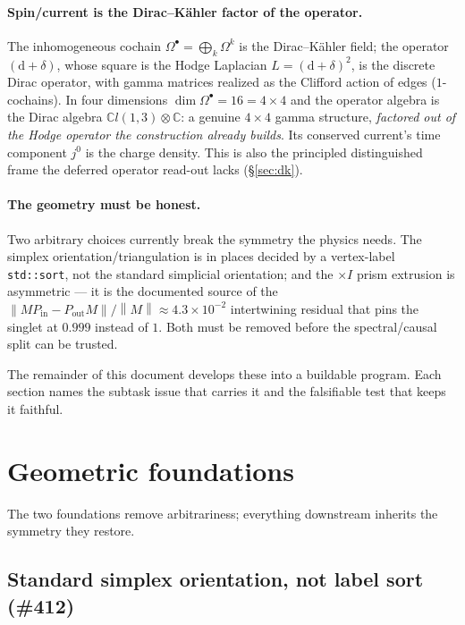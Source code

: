 \documentclass[11pt]{article}
\theoremstyle{definition}
\newcommand{\C}{\mathbb{C}}
\newcommand{\norm}[1]{\left\lVert #1 \right\rVert}
\newcommand{\Pin}{P_{\mathrm{in}}}
\newcommand{\Pout}{P_{\mathrm{out}}}
\newcommand{\dd}{\mathrm{d}}
\begin{document}
\paragraph{Spin/current is the Dirac--K\"ahler factor of the operator.} The inhomogeneous
cochain $\Omega^\bullet=\bigoplus_k\Omega^k$ is the Dirac--K\"ahler field; the operator
$(\dd+\delta)$, whose square is the Hodge Laplacian $L=(\dd+\delta)^2$, is the discrete
Dirac operator, with gamma matrices realized as the Clifford action of edges
($1$-cochains). In four dimensions $\dim\Omega^\bullet = 16 = 4\times4$ and the operator
algebra is the Dirac algebra $\C l(1,3)\otimes\C$: a genuine $4\times4$ gamma structure,
\emph{factored out of the Hodge operator the construction already builds}. Its conserved
current's time component $j^0$ is the charge density. This is also the principled
distinguished frame the deferred operator read-out lacks (\S\ref{sec:dk}).

\paragraph{The geometry must be honest.} Two arbitrary choices currently break the
symmetry the physics needs. The simplex orientation/triangulation is in places decided
by a vertex-label \texttt{std::sort}, not the standard simplicial orientation; and the
$\times I$ prism extrusion is asymmetric --- it is the documented source of the
$\norm{M\Pin-\Pout M}/\norm{M}\approx 4.3\times10^{-2}$ intertwining residual that pins
the singlet at $0.999$ instead of $1$. Both must be removed before the spectral/causal
split can be trusted.

\medskip
\noindent The remainder of this document develops these into a buildable program. Each
section names the subtask issue that carries it and the falsifiable test that keeps it
faithful.

\section{Geometric foundations}
\label{sec:foundations}

The two foundations remove arbitrariness; everything downstream inherits the symmetry
they restore.

\subsection{Standard simplex orientation, not label sort (\#412)}
\label{sec:orientation}
\end{document}
